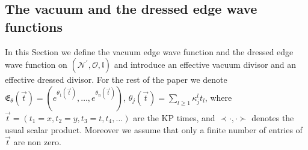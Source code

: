 \documentclass[11pt]{amsart}
\theoremstyle{plain}
\numberwithin{equation}{section}
\begin{document}
\subsection{The vacuum and the dressed edge wave functions}\label{sec:vertex_wavefn_general_case}

In this Section we define the vacuum edge wave function and the dressed edge wave function on $({\mathcal N}^{\prime}, \mathcal O, \mathfrak l)$ and introduce an effective vacuum divisor and an effective dressed divisor. For the rest of the paper we denote ${\mathfrak E}_\theta (\vec t) = (e^{\theta_1(\vec t)}, \dots, e^{\theta_n(\vec t)})$, $\theta_j(\vec t) = \sum_{l\ge 1} \kappa_j^{l} t_l$, where $\vec t =(t_1=x,t_2=y,t_3=t, t_4,\dots)$ are the KP times, and 
 $\prec \cdot, \cdot\succ $ denotes the usual scalar product. Moreover we assume that only a finite number of entries of $\vec t$ are non zero.
\end{document}
